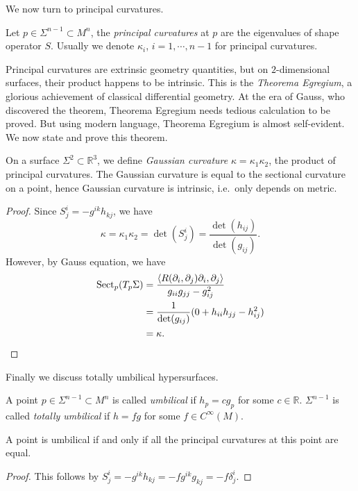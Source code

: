 We now turn to principal curvatures.

\begin{defn}
    Let $p\in\Sigma^{n-1}\subset M^n$, the \emph{principal curvatures} at $p$ are the eigenvalues of shape operator $S$.
    Usually we denote $\kappa_i$, $i=1,\cdots,n-1$ for principal curvatures.
\end{defn}

Principal curvatures are extrinsic geometry quantities, but on $2$-dimensional surfaces, their product happens to be intrinsic.
This is the \emph{Theorema Egregium}, a glorious achievement of classical differential geometry.
At the era of Gauss, who discovered the theorem, Theorema Egregium needs tedious calculation to be proved.
But using modern language, Theorema Egregium is almost self-evident.
We now state and prove this theorem.

\begin{thm}
    On a surface $\Sigma^2\subset\mathbb{R}^3$, we define \emph{Gaussian curvature} $\kappa=\kappa_1\kappa_2$, the product of principal curvatures.
    The Gaussian curvature is equal to the sectional curvature on a point, hence Gaussian curvature is intrinsic, i.e.\ only depends on metric.
\end{thm}
\begin{proof}
    Since $S^i_j=-g^{ik}h_{kj}$, we have
    \[\kappa=\kappa_1\kappa_2=\det(S^i_j)=\frac{\det(h_{ij})}{\det(g_{ij})}.\]
    However, by Gauss equation, we have
    \begin{align*}
        \operatorname{Sect}_p(T_p\Sigma)&=\frac{\langle R(\partial_i,\partial_j)\partial_i,\partial_j\rangle}{g_{ii}g_{jj}-g_{ij}^2}\\
        &=\frac{1}{\det(g_{ij})}(0+h_{ii}h_{jj}-h_{ij}^2)\\
        &=\kappa.\qedhere
    \end{align*}
\end{proof}

Finally we discuss totally umbilical hypersurfaces.
\begin{defn}
    A point $p\in\Sigma^{n-1}\subset M^n$ is called \emph{umbilical} if $h_p=cg_p$ for some $c\in\mathbb{R}$.
    $\Sigma^{n-1}$ is called \emph{totally umbilical} if $h=fg$ for some $f\in C^\infty(M)$.
\end{defn}

\begin{lem}\label{totally umbilical}
    A point is umbilical if and only if all the principal curvatures at this point are equal.
\end{lem}
\begin{proof}
    This follows by $S^i_j=-g^{ik}h_{kj}=-fg^{ik}g_{kj}=-f\delta^i_j$.
\end{proof}


